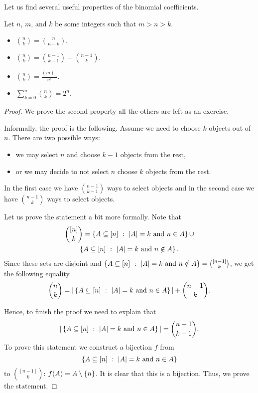 Let us find several useful properties of the binomial coefficients.
\begin{theorem}
  Let $n$, $m$, and $k$ be some integers such that $m > n > k$.
  \begin{itemize}
    \item $\binom{n}{k} = \binom{n}{n - k}$.
    \item $\binom{n}{k} = \binom{n - 1}{k - 1} + \binom{n - 1}{k}$.
    \item $\binom{n}{k} = \frac{(m)_n}{n!}$.
    \item $\sum_{k = 0}^n \binom{n}{k} = 2^n$.
  \end{itemize}
\end{theorem}
\begin{proof}
  We prove the second property all the others are left as an exercise.

  Informally, the proof is the following. Assume we need to choose $k$ objects
  out of $n$. There are two possible ways:
  \begin{itemize}
    \item we may select $n$ and choose $k - 1$ objects from the rest,
    \item or we may decide to not select $n$ choose $k$ objects from the rest.
  \end{itemize}
  In the first case we have $\binom{n - 1}{k - 1}$ ways to select objects and
  in the second case we have $\binom{n - 1}{k}$ ways to select objects.

  Let us prove the statement a bit more formally. Note that
  \begin{multline*}
    \binom{[n]}{k} = \set[|A| = k \text{ and } n \in A]{A \subseteq [n]} \cup \\
    \set[|A| = k \text{ and } n \notin A]{A \subseteq [n]}.
  \end{multline*}
  Since these sets are disjoint and $\set[|A| = k \text{ and } n \notin A]{A
  \subseteq [n]} = \binom{[n - 1]}{k}$, we get the following equality
  \[
    \binom{n}{k} = |\set[|A| = k \text{ and } n \in A]{A \subseteq [n]}| +
    \binom{n - 1}{k}.
  \]

  Hence, to finish the proof we need to explain that
  \[
    |\set[|A| = k \text{ and } n \in A]{A \subseteq [n]}| =
    \binom{n - 1}{k - 1}.
  \]
  To prove this statement we construct a bijection $f$
  from \[
    \set[|A| = k \text{ and } n \in A]{A \subseteq [n]}
  \] to
  $\binom{[n - 1]}{k}$: $f(A) = A \setminus \set{n}$.
  It is clear that this is a bijection. Thus, we prove the statement.
\end{proof}

